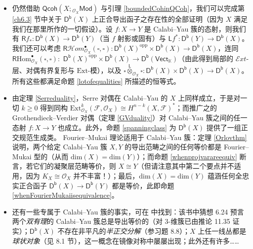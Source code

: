 \begin{itemize}[leftmargin=0.5cm]
\item 仍然借助 $\mathsf{Qcoh}(X;{}_{\mathcal{O}_X}\!\mathsf{Mod})$ 与引理 \ref{boundedCohinQCoh}，我们可以完成第 \ref{ch6.3} 节中关于 $\mathsf{D^b}(X)$ 上正合导出函子之存在性的全部证明（因为 $X$ 满足我们在那里所作的一切假设）。设 $f:X\rightarrow Y$ 是 Calabi--Yau 簇的态射，则我们有 $\mathsf{R}f_*:\mathsf{D^b}(X)\rightarrow\mathsf{D^b}(Y)$（当 $f$ 射影或固有）与 $\mathsf{L}f^*:\mathsf{D^b}(Y)\rightarrow\mathsf{D^b}(X)$。我们还可以考虑 $\mathsf{R}\mathcal{H}om_{\mathcal{O}_X}^\bullet(\square,\square):\mathsf{D^b}(X)^\text{opp}\times\mathsf{D^b}(X)\rightarrow\mathsf{D^b}(X)$，连同 $\mathsf{R}\text{Hom}_{\mathcal{O}_X}^\bullet(\square,\square):$ $\mathsf{D^b}(X)^\text{opp}\times\mathsf{D^b}(X)\rightarrow\mathsf{D^b}(\mathsf{Vect}_\mathbb{K})$（由此得到局部的 $\mathcal{E}xt$-层、对偶有界复形与 $\text{Ext}$-模），以及 $\square\overset{\mathsf{L}}{\otimes}_{\mathcal{O}_X}\!\square:\mathsf{D^b}(X)\times\mathsf{D^b}(X)\rightarrow\mathsf{D^b}(X)$。所有这些都满足命题 \ref{lotofequalities} 所描述的恒等式。

\item 由定理 \ref{Serreduality}，Serre 对偶在 Calabi--Yau 的 $X$ 上同样成立，于是对一切 $k\geq 0$ 得到同构 $\text{Ext}_{\mathcal{O}_X}^k(\mathcal{F},\mathcal{O}_X)\cong H^{n-k}(X,\mathcal{F})^*$；而推广之的 Grothendieck--Verdier 对偶（定理 \ref{GVduality}）对 Calabi--Yau 簇之间的任一态射 $f:X\rightarrow Y$ 也成立。此外，命题 \ref{spanningclass} 为 $\mathsf{D^b}(X)$ 提供了一组正交规范生成类。
\newline Fourier--Mukai 理论适用于 Calabi--Yau 簇：定理 \ref{Orlovthm} 说明，两个给定 Calabi--Yau 簇 $X,Y$ 的导出范畴之间的任何等价都是 Fourier--Mukai 型的（从而 $\text{dim}(X)=\text{dim}(Y)$）；而命题 \ref{whenprojvarareequiv} 断言，若它们的凝聚层范畴等价，则 $X\cong Y$（但请注意其中第二个要点并不适用，因为 $K_X\cong\mathcal{O}_X$ 并不丰富！）；最后，$\text{dim}(X)=\text{dim}(Y)$ 蕴涵任何全忠实正合函子 $\mathsf{D^b}(X)\rightarrow\mathsf{D^b}(Y)$ 都是等价，此即命题 \ref{whenFourierMukaiisequivalence}。

\item 还有一些专属于 Calabi--Yau 簇的事实，可在 \cite{[Huy06]} 中找到：该书中猜想 6.24 预言两个\textit{双有理}的 Calabi--Yau 簇总是导出等价的（对 3-维簇已由推论 11.35 证实）；$\mathsf{D^b}(X)$ 不存在非平凡的\textit{半正交分解}（参习题 8.8）；$X$ 上任一线丛都是\textit{球状对象}（见 8.1 节），这一概念在镜像对称中屡屡出现；此外还有许多……
\end{itemize}


